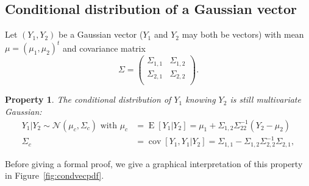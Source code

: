 \documentclass[twoside,openright]{report}
\DeclareMathOperator*{\E}{E}
\DeclareMathOperator*{\Cov}{cov}
\newtheorem{property}{Property}
\begin{document}
\subsection*{Conditional distribution of a Gaussian vector}
\label{sec:condvec}
Let $(Y_1,Y_2)$ be a Gaussian vector ($Y_1$ and $Y_2$ may both be vectors) with mean $\mu = (\mu_1,\mu_2)^t$ and covariance matrix
\begin{equation}
\Sigma = 
\begin{pmatrix}
	\Sigma_{1,1} & \Sigma_{1,2}\\
	\Sigma_{2,1} & \Sigma_{2,2}\\
\end{pmatrix}.
\end{equation}
\begin{property}
\label{prop:condGV}
The conditional distribution of $Y_1$ knowing $Y_2$ is still multivariate Gaussian:
\begin{equation}
\begin{split}
	Y_1|Y_2 \sim \mathcal{N}(\mu_c,\Sigma_c) \text{ with }\mu_c &= \E [Y_1|Y_2] = \mu_1 + \Sigma_{1,2} \Sigma_{22}^{-1} (Y_2-\mu_2)\\ 
	\Sigma_c &= \Cov [Y_1,Y_1|Y_2] = \Sigma_{1,1} - \Sigma_{1,2} \Sigma_{2,2}^{-1} \Sigma_{2,1},
\end{split}
\end{equation}
\end{property}
Before giving a formal proof, we give a graphical interpretation of this property in Figure~\ref{fig:condvecpdf}.
\end{document}
